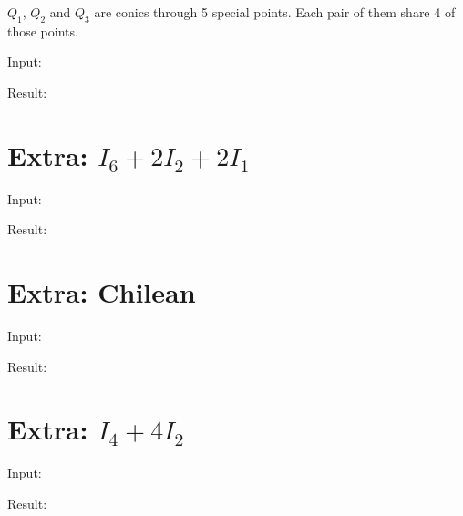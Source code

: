 \documentclass{article}
\begin{document}
$Q_1$, $Q_2$ and $Q_3$ are conics through 5 special points. Each pair of them share 4 of those points.


Input:

Result:



\section{Extra: $I_6 + 2I_2 + 2I_1$}

Input:

Result:



\section{Extra: \textbf{Chilean}}

Input:

Result:



\section{Extra: $I_4 + 4I_2$}

Input:

Result:




% 
% 
\end{document}
